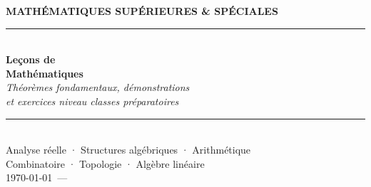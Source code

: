 
\begin{titlepage}
\thispagestyle{empty}

\vspace*{3cm}

\begin{flushright}
  {\fontsize{11}{14}\selectfont\color{goldaccent}\bfseries
    MATHÉMATIQUES SUPÉRIEURES \& SPÉCIALES}\\[0.5cm]
  \noindent\textcolor{navyblue!25}{\rule{12cm}{0.5pt}}\\[1.2cm]

  {\fontsize{38}{44}\selectfont\bfseries\color{navyblue}
    Leçons de\\[4pt] Mathématiques}\\[1.4cm]

  {\fontsize{13}{18}\selectfont\itshape\color{navyblue!60}
    Théorèmes fondamentaux, démonstrations\\
    et exercices niveau classes préparatoires}\\[3cm]

  \noindent\textcolor{navyblue!25}{\rule{12cm}{0.5pt}}\\[0.8cm]

  {\large\color{navyblue!70}
    Analyse réelle \textcolor{goldaccent}{·}
    Structures algébriques \textcolor{goldaccent}{·}
    Arithmétique\\[6pt]
    Combinatoire \textcolor{goldaccent}{·}
    Topologie \textcolor{goldaccent}{·}
    Algèbre linéaire}\\[2.5cm]

  {\normalsize\color{navyblue!50} \today\ — \currenttime}
\end{flushright}

\vfill

\begin{flushleft}
  \hspace{2.2cm}
\end{flushleft}
\end{titlepage}
\clearpage
